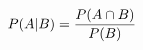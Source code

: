 \documentclass[preview]{standalone}
\begin{document}
\begin{align*}
\special{dvisvgm:raw <g id='unique000'>}P(A|B) = \frac{P(A \cap B)}{P(B)}\special{dvisvgm:raw </g>}
\end{align*}
\end{document}
